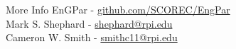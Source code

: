 \documentclass[final]{beamer}
\newlength{\sepwid}
\newlength{\onecolwid}
\begin{document}
\begin{frame}[t]
\begin{columns}[t]
\begin{column}{\onecolwid}
\begin{block}{More Info}
  EnGPar - \url{github.com/SCOREC/EngPar} \\
  Mark S. Shephard - \url{shephard@rpi.edu} \\
  Cameron W. Smith - \url{smithc11@rpi.edu} \\
\end{block}



\end{column} %

\begin{column}{\sepwid}\end{column} %

\end{columns} %

\end{frame} %
\end{document}
